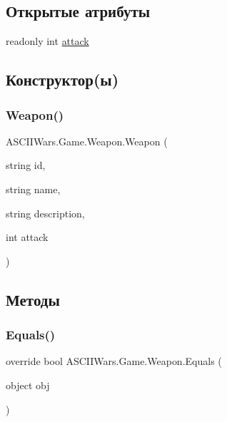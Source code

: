 \subsection*{Открытые атрибуты}
\begin{DoxyCompactItemize}
\item 
readonly int \hyperlink{class_a_s_c_i_i_wars_1_1_game_1_1_weapon_a70166ce84757794de92f0a52de55bb04}{attack}
\end{DoxyCompactItemize}


\subsection{Конструктор(ы)}
\hypertarget{class_a_s_c_i_i_wars_1_1_game_1_1_weapon_ab292fb175c5d6e29ec2918069f831d4c}{}\label{class_a_s_c_i_i_wars_1_1_game_1_1_weapon_ab292fb175c5d6e29ec2918069f831d4c} 
\subsubsection{\texorpdfstring{Weapon()}{Weapon()}}
{\footnotesize\ttfamily A\+S\+C\+I\+I\+Wars.\+Game.\+Weapon.\+Weapon (\begin{DoxyParamCaption}\item[{string}]{id,  }\item[{string}]{name,  }\item[{string}]{description,  }\item[{int}]{attack }\end{DoxyParamCaption})\hspace{0.3cm}{\ttfamily [inline]}}



\subsection{Методы}
\hypertarget{class_a_s_c_i_i_wars_1_1_game_1_1_weapon_a281a4ca4d8a376aeda8408551ee168cf}{}\label{class_a_s_c_i_i_wars_1_1_game_1_1_weapon_a281a4ca4d8a376aeda8408551ee168cf} 
\subsubsection{\texorpdfstring{Equals()}{Equals()}}
{\footnotesize\ttfamily override bool A\+S\+C\+I\+I\+Wars.\+Game.\+Weapon.\+Equals (\begin{DoxyParamCaption}\item[{object}]{obj }\end{DoxyParamCaption})\hspace{0.3cm}{\ttfamily [inline]}}

